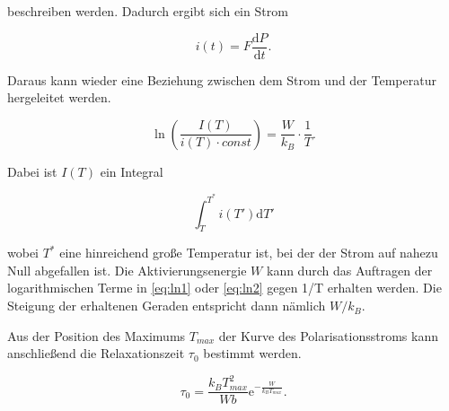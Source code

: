 beschreiben werden.
Dadurch ergibt sich ein Strom

\begin{equation}
  i(t) = F \frac{\mathrm{d} P}{\mathrm{d} t} .
\end{equation}

Daraus kann wieder eine Beziehung zwischen dem Strom und der Temperatur hergeleitet werden.

\begin{equation}
	\ln\left(\frac{I(T)}{i(T) \cdot const}\right) = \frac{W}{k_B} \cdot \frac{1}{T} \label{eq:ln2} .
\end{equation}

Dabei ist $I(T)$ ein Integral

\begin{equation}
	\int_{T}^{T^*} i(T') \mathrm{d}T'
\end{equation}

wobei $T^*$ eine hinreichend große Temperatur ist, bei der der Strom auf nahezu Null abgefallen ist.
Die Aktivierungsenergie $W$ kann durch das Auftragen der logarithmischen Terme in \eqref{eq:ln1} oder \eqref{eq:ln2} gegen
1/T erhalten werden. Die Steigung der erhaltenen Geraden entspricht dann nämlich $W/k_B$.

Aus der Position des Maximums $T_{max}$ der Kurve des Polarisationsstroms kann anschließend die Relaxationszeit $\tau_0$
bestimmt werden.

\begin{equation}
	\tau_0 = \frac{k_B T^2_{max}}{W b} \mathrm{e}^{-\frac{W}{k_B T_{max}}} .
\end{equation}
